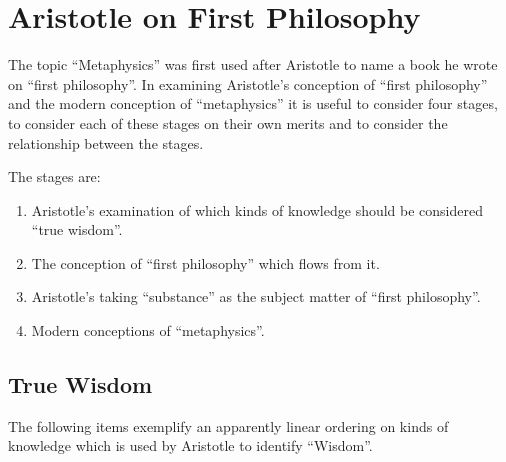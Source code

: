 \documentclass[10pt,titlepage]{article}
\begin{document}
\section{Aristotle on First Philosophy}\label{AristotleMetaphysics}

The topic ``Metaphysics'' was first used after Aristotle to name a book he wrote on ``first philosophy''.
In examining Aristotle's conception of ``first philosophy'' and the modern conception of ``metaphysics'' it is useful to consider four stages, to consider each of these stages on their own merits and to consider the relationship between the stages.

The stages are:
\begin{enumerate}
\item Aristotle's examination of which kinds of knowledge should be considered ``true wisdom''.
\item The conception of ``first philosophy'' which flows from it.
\item Aristotle's taking ``substance'' as the subject matter of ``first philosophy''.
\item Modern conceptions of ``metaphysics''.
\end{enumerate}

\subsection{True Wisdom}

The following items exemplify an apparently linear ordering on kinds of knowledge which is used by Aristotle to identify ``Wisdom''.
\end{document}
